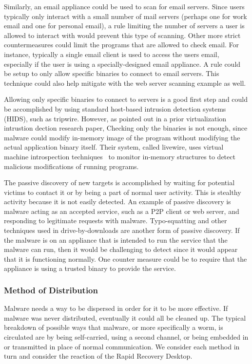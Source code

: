 Similarly, an email appliance could be used to scan for email servers. Since users typically only interact with a small number of mail servers (perhaps one for work email and one for personal email), a rule limiting the number of servers a user is allowed to interact with would prevent this type of scanning. Other more strict countermeasures could limit the programs that are allowed to check email. For instance, typically a single email client is used to access the users email, especially if the user is using a specially-designed email appliance. A rule could be setup to only allow specific binaries to connect to email servers. This technique could also help mitigate with the web server scanning example as well.

Allowing only specific binaries to connect to servers is a good first step and could be accomplished by using standard host-based intrusion detection systems (HIDS), such as tripwire\cite{tripwire_1994}. However, as pointed out in a prior virtualization intrustion dection research paper\cite{VMI_IDS_2003}, Checking only the binaries is not enough, since malware could modify in-memory image of the program without modifying the actual application binary itself. Their system, called livewire, uses virtual machine introspection techniques~\cite{xenaccess_07,vmsafe_news_2008} to monitor in-memory structures to detect malicious modifications of running programs.

The passive discovery of new targets is accomplished by waiting for potential victims to contact it or by being a part of normal user activity. This is stealthy activity because it is not easily detected. An example of passive discovery is malware acting as an accepted service, such as a P2P client or web server, and responding to legitimate requests with malware. Typo-squatting and other techniques used in drive-by-downloads are another form of passive discovery. If the malware is on an appliance that is intended to run the service that the malware can run, then it would be challenging to detect since it would appear that it is functioning normally. One counter measure could be to require that the appliance is using a trusted binary to provide the service.

\subsubsection{Method of Distribution}

Malware needs a way to be dispersed in order for it to be more effective. If malware was never distributed, eventually it could all be cleaned up. The typical breakdown of possible ways that malware, or more specifically a worm, is circulated are by being self-carried, using a second channel, or being embedded in or transmitted in place of normal communication. We consider each method in turn and consider the reaction of the Rapid Recovery Desktop.

